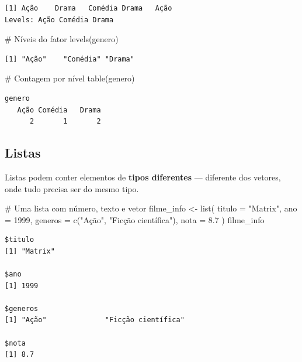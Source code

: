 \documentclass[
  letterpaper,
]{scrbook}
\newenvironment{Shaded}{\begin{snugshade}}{\end{snugshade}}
\newcommand{\AttributeTok}[1]{\textcolor[rgb]{0.40,0.45,0.13}{#1}}
\newcommand{\CommentTok}[1]{\textcolor[rgb]{0.37,0.37,0.37}{#1}}
\newcommand{\DecValTok}[1]{\textcolor[rgb]{0.68,0.00,0.00}{#1}}
\newcommand{\FloatTok}[1]{\textcolor[rgb]{0.68,0.00,0.00}{#1}}
\newcommand{\FunctionTok}[1]{\textcolor[rgb]{0.28,0.35,0.67}{#1}}
\newcommand{\NormalTok}[1]{\textcolor[rgb]{0.00,0.23,0.31}{#1}}
\newcommand{\OtherTok}[1]{\textcolor[rgb]{0.00,0.23,0.31}{#1}}
\newcommand{\StringTok}[1]{\textcolor[rgb]{0.13,0.47,0.30}{#1}}
\begin{document}
\begin{verbatim}
[1] Ação    Drama   Comédia Drama   Ação   
Levels: Ação Comédia Drama
\end{verbatim}

\begin{Shaded}
\begin{Highlighting}[]
\CommentTok{\# Níveis do fator}
\FunctionTok{levels}\NormalTok{(genero)}
\end{Highlighting}
\end{Shaded}

\begin{verbatim}
[1] "Ação"    "Comédia" "Drama"  
\end{verbatim}

\begin{Shaded}
\begin{Highlighting}[]
\CommentTok{\# Contagem por nível}
\FunctionTok{table}\NormalTok{(genero)}
\end{Highlighting}
\end{Shaded}

\begin{verbatim}
genero
   Ação Comédia   Drama 
      2       1       2 
\end{verbatim}

\subsection{Listas}\label{listas}

Listas podem conter elementos de \textbf{tipos diferentes} --- diferente
dos vetores, onde tudo precisa ser do mesmo tipo.

\begin{Shaded}
\begin{Highlighting}[]
\CommentTok{\# Uma lista com número, texto e vetor}
\NormalTok{filme\_info }\OtherTok{\textless{}{-}} \FunctionTok{list}\NormalTok{(}
  \AttributeTok{titulo =} \StringTok{"Matrix"}\NormalTok{,}
  \AttributeTok{ano =} \DecValTok{1999}\NormalTok{,}
  \AttributeTok{generos =} \FunctionTok{c}\NormalTok{(}\StringTok{"Ação"}\NormalTok{, }\StringTok{"Ficção científica"}\NormalTok{),}
  \AttributeTok{nota =} \FloatTok{8.7}
\NormalTok{)}
\NormalTok{filme\_info}
\end{Highlighting}
\end{Shaded}

\begin{verbatim}
$titulo
[1] "Matrix"

$ano
[1] 1999

$generos
[1] "Ação"              "Ficção científica"

$nota
[1] 8.7
\end{verbatim}
\end{document}
